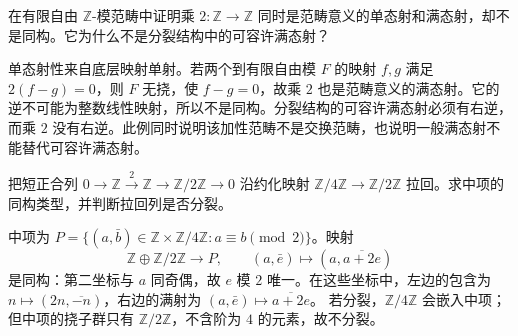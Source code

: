 \begin{exercise}\label{b4:ex:B-nonbalanced-free}
	在有限自由 \(\mathbb Z\)-模范畴中证明乘 \(2:\mathbb Z\rightarrow\mathbb Z\) 同时是范畴意义的单态射和满态射，却不是同构。它为什么不是分裂结构中的可容许满态射？
\end{exercise}
\begin{solution}
	单态射性来自底层映射单射。若两个到有限自由模 \(F\) 的映射 \(f,g\) 满足 \(2(f-g)=0\)，则 \(F\) 无挠，使 \(f-g=0\)，故乘 \(2\) 也是范畴意义的满态射。它的逆不可能为整数线性映射，所以不是同构。分裂结构的可容许满态射必须有右逆，而乘 \(2\) 没有右逆。此例同时说明该加性范畴不是交换范畴，也说明一般满态射不能替代可容许满态射。
\end{solution}

\begin{exercise}\label{b4:ex:B-pullback-integers}
	把短正合列 \(0\rightarrow\mathbb Z\xrightarrow{2}\mathbb Z\rightarrow\mathbb Z/2\mathbb Z\rightarrow0\) 沿约化映射 \(\mathbb Z/4\mathbb Z\rightarrow\mathbb Z/2\mathbb Z\) 拉回。求中项的同构类型，并判断拉回列是否分裂。
\end{exercise}
\begin{solution}
	中项为 \(P=\bigl\{(a,\bar b)\in\mathbb Z\times\mathbb Z/4\mathbb Z:a\equiv b\pmod2\bigr\}\)。映射
	\[
		\mathbb Z\oplus\mathbb Z/2\mathbb Z\longrightarrow P,\qquad (a,\bar e)\longmapsto(a,\overline{a+2e})
	\]
	是同构：第二坐标与 \(a\) 同奇偶，故 \(e\) 模 \(2\) 唯一。在这些坐标中，左边的包含为 \(n\mapsto(2n,\overline{-n})\)，右边的满射为 \((a,\bar e)\mapsto\overline{a+2e}\)。 若分裂，\(\mathbb Z/4\mathbb Z\) 会嵌入中项；但中项的挠子群只有 \(\mathbb Z/2\mathbb Z\)，不含阶为 \(4\) 的元素，故不分裂。
\end{solution}

